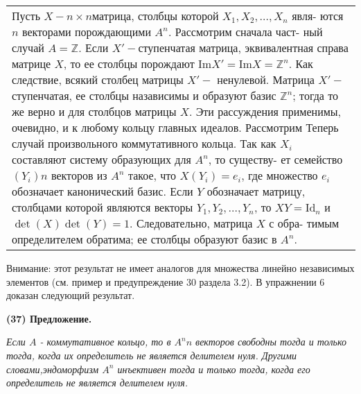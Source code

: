 \documentclass{mai_book}
\begin{document}
	\begin{tabular}{|p{12.5cm}}
	\noindent
	Пусть $X - n\times n$матрица, столбцы которой $X_1, X_2, \ldots, X_n$ явля-\linebreak
	ются $n$ векторами порождающими $A^n$. Рассмотрим сначала част-\linebreak
	ный случай $A = \mathbb Z$. Если $X' - $ступенчатая матрица, эквивалентная\linebreak
	справа матрице $X$, то ее столбцы порождают Im$X' = $Im$X = \mathbb Z^n$.\linebreak
	Как следствие, всякий столбец матрицы $X' -$ ненулевой. Матрица\linebreak
	$X' -$ ступенчатая, ее столбцы назависимы и образуют базис $\mathbb Z^n$;\linebreak
	тогда то же верно и для столбцов матрицы $X$. Эти рассуждения\linebreak
	применимы, очевидно, и к любому кольцу главных идеалов.\linebreak
	Рассмотрим Теперь случай произвольного коммутативного кольца.\linebreak
	Так как $X_i$ составляют систему образующих для $A^n$, то существу-\linebreak
	ет семейство $(Y_i) n$ векторов из $A^n$ такое, что $X(Y_i) = e_i$, где\linebreak
	множество $e_i$ обозначает канонический базис. Если $Y$ обозначает\linebreak
	матрицу, столбцами которой являются векторы $Y_1, Y_2, \ldots, Y_n$, то\linebreak
	$XY = \text{Id}_n$ и $\det(X)\det(Y) = 1$. Следовательно, матрица $X$ с обра-\linebreak
	тимым определителем обратима; ее столбцы образуют базис в $A^n$.
	\end{tabular}
	
	Внимание: этот результат не имеет аналогов для множества линейно\linebreak
	независимых элементов (см. пример и предупреждение 30 раздела 3.2).\linebreak
	В упражнении 6 доказан следующий результат.
	
	\noindent
	{\bf (37) Предложение.}
	
	{\it Если $A$ - коммутативное кольцо, то в $A^n n$ векторов свободны\linebreak
	тогда и только тогда, когда их определитель не является делителем\linebreak
	нуля. Другими словами,эндоморфизм $A^n$ инъективен тогда и только\linebreak
	тогда, когда его определитель не является делителем нуля.}
	
\end{document}
